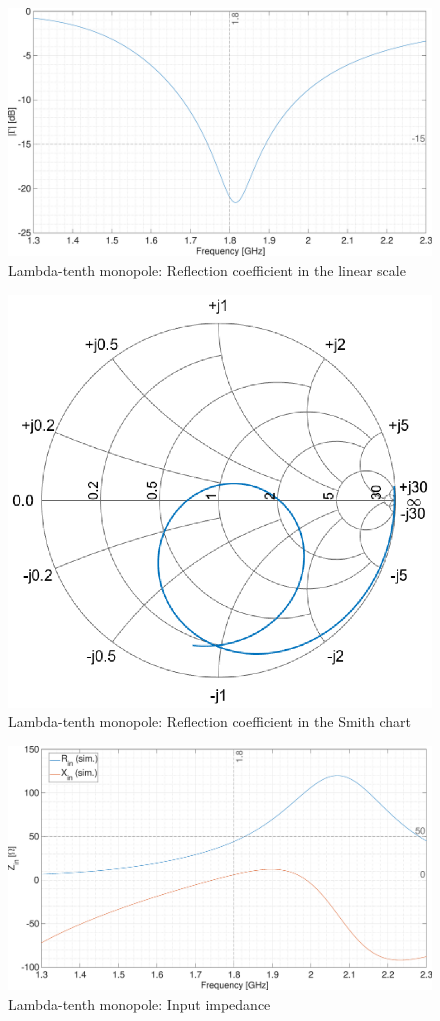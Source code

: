 \documentclass[11pt,a4paper]{article}
\begin{document}
        \begin{figure}[!ht]
            \centering
            \includegraphics[width=.8\textwidth]{src/lambda-tenth-reflection-linear.eps}
            \caption{\label{fig:lambda-tenth-reflection-linear}Lambda-tenth monopole: Reflection coefficient in the linear scale}
        \end{figure}
        
        \begin{figure}[!ht]
            \centering
            \includegraphics[width=.8\textwidth]{src/lambda-tenth-reflection-smith.eps}
            \caption{\label{fig:lambda-tenth-reflection-smith}Lambda-tenth monopole: Reflection coefficient in the Smith chart}
        \end{figure}

        \begin{figure}[!ht]
            \centering
            \includegraphics[width=.8\textwidth]{src/lambda-tenth-impedance.eps}
            \caption{\label{fig:lambda-tenth-impedance}Lambda-tenth monopole: Input impedance}
        \end{figure}
\end{document}

